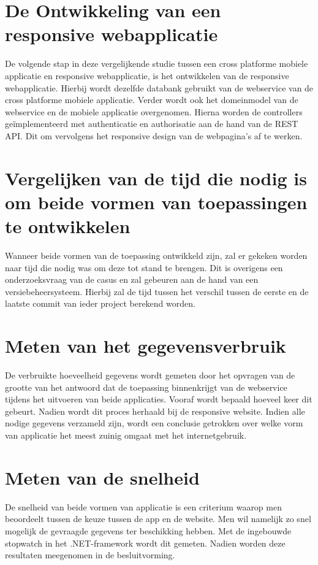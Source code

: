 \section{De Ontwikkeling van een responsive webapplicatie}
De volgende stap in deze vergelijkende studie tussen een cross platforme mobiele applicatie en responsive webapplicatie, is het
ontwikkelen van de responsive webapplicatie. Hierbij wordt dezelfde databank gebruikt van de webservice van de cross platforme
mobiele applicatie. Verder wordt ook het domeinmodel van de webservice en de mobiele applicatie overgenomen. Hierna worden de controllers
geïmplementeerd met authenticatie en authorisatie aan de hand van de REST API.
Dit om vervolgens het responsive design van de webpagina's af te werken.

\section{Vergelijken van de tijd die nodig is om beide vormen van toepassingen te ontwikkelen}
Wanneer beide vormen van de toepassing ontwikkeld zijn, zal er gekeken worden naar tijd die nodig was om deze tot stand te brengen.
Dit is overigens een onderzoeksvraag van de casus en zal gebeuren aan de hand van een versiebeheersysteem.
Hierbij zal de tijd tussen het verschil tussen de eerste en de laatste commit van ieder project berekend worden.

\section{Meten van het gegevensverbruik}
De verbruikte hoeveelheid gegevens wordt gemeten door het opvragen van de grootte van het antwoord dat de toepassing binnenkrijgt van de webservice tijdens het uitvoeren van beide
applicaties. Vooraf wordt bepaald hoeveel keer dit gebeurt.
Nadien wordt dit proces herhaald bij de responsive website. Indien alle nodige gegevens verzameld zijn, wordt een conclusie
getrokken over welke vorm van applicatie het meest zuinig omgaat met het internetgebruik.

\section{Meten van de snelheid}
De snelheid van beide vormen van applicatie is een criterium waarop men beoordeelt tussen de keuze tussen de app en de website.
Men wil namelijk zo snel mogelijk de gevraagde gegevens ter beschikking hebben. Met de ingebouwde stopwatch in het .NET-framework wordt
dit gemeten. Nadien worden deze resultaten meegenomen in de besluitvorming.

